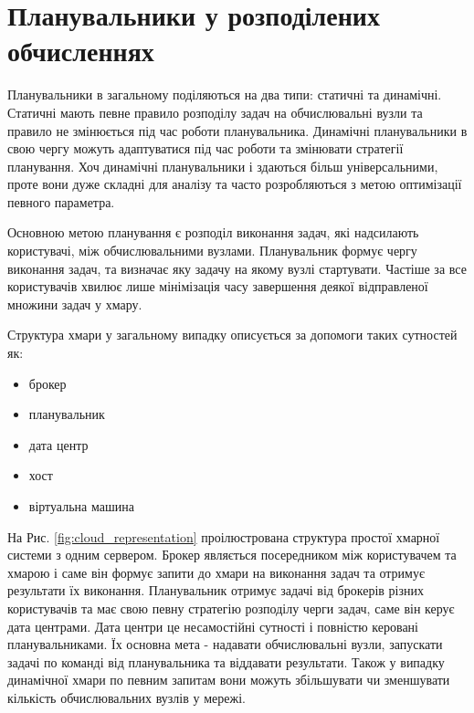 
\section{Планувальники у розподілених обчисленнях}

Планувальники в загальному поділяються на два типи: статичні та динамічні. Статичні мають певне правило розподілу задач на обчислювальні вузли та правило не змінюється під час роботи планувальника. Динамічні планувальники в свою чергу можуть адаптуватися під час роботи та змінювати стратегії планування. Хоч динамічні планувальники і здаються більш універсальними, проте вони дуже складні для аналізу та часто розробляються з метою оптимізації певного параметра.

Основною метою планування є розподіл виконання задач, які надсилають користувачі, між обчислювальними вузлами. Планувальник формує чергу виконання задач, та визначає яку задачу на якому вузлі стартувати. Частіше за все користувачів хвилює лише мінімізація часу завершення деякої відправленої множини задач у хмару.

Структура хмари у загальному випадку описується за допомоги таких сутностей як:
\begin{itemize}
	\item брокер
	\item планувальник
	\item дата центр
	\item хост
	\item віртуальна машина
\end{itemize}

На Рис. \ref{fig:cloud_representation} проілюстрована структура простої хмарної системи з одним сервером. Брокер являється посередником між користувачем та хмарою і саме він формує запити до хмари на виконання задач та отримує результати їх виконання. Планувальник отримує задачі від брокерів різних користувачів та має свою певну стратегію розподілу черги задач, саме він керує дата центрами. Дата центри це несамостійні сутності і повністю керовані планувальниками. Їх основна мета - надавати обчислювальні вузли, запускати задачі по команді від планувальника та віддавати результати. Також у випадку динамічної хмари по певним запитам вони можуть збільшувати чи зменшувати кількість обчислювальних вузлів у мережі.


